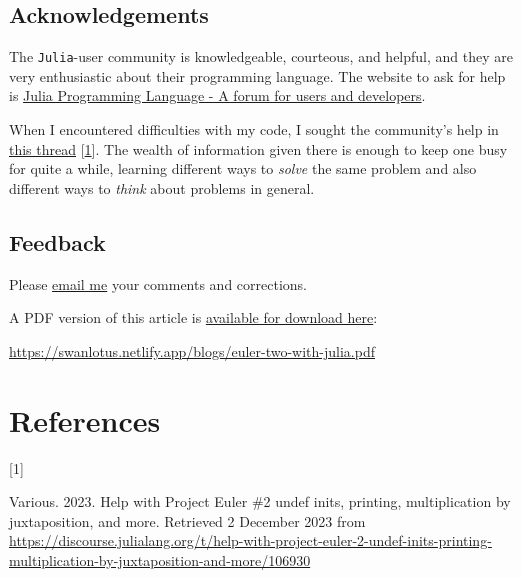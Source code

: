 \documentclass[
  a4paper,
]{article}
\newlength{\cslhangindent}
\newlength{\csllabelwidth}
\newlength{\cslentryspacingunit} %
\newenvironment{CSLReferences}[2] %
 {%
  \setlength{\parindent}{0pt}
  \ifodd #1
  \let\oldpar\par
  \def\par{\hangindent=\cslhangindent\oldpar}
  \fi
  \setlength{\parskip}{#2\cslentryspacingunit}
 }%
 {}
\newcommand{\CSLLeftMargin}[1]{\parbox[t]{\csllabelwidth}{#1}}
\newcommand{\CSLRightInline}[1]{\parbox[t]{\linewidth - \csllabelwidth}{#1}\break}
\begin{document}
\hypertarget{acknowledgements}{%
\subsection{Acknowledgements}\label{acknowledgements}}

The \texttt{Julia}-user community is knowledgeable, courteous, and
helpful, and they are very enthusiastic about their programming
language. The website to ask for help is
\href{https://discourse.julialang.org/}{Julia Programming Language - A
forum for users and developers}.

When I encountered difficulties with my code, I sought the community's
help in
\href{https://discourse.julialang.org/t/help-with-project-euler-2-undef-inits-printing-multiplication-by-juxtaposition-and-more/106930}{this
thread} {[}\protect\hyperlink{ref-julia-help}{1}{]}. The wealth of
information given there is enough to keep one busy for quite a while,
learning different ways to \emph{solve} the same problem and also
different ways to \emph{think} about problems in general.

\hypertarget{feedback}{%
\subsection{Feedback}\label{feedback}}

Please \href{mailto:feedback.swanlotus@gmail.com}{email me} your
comments and corrections.

\noindent A PDF version of this article is
\href{/euler-two-with-julia.pdf}{available for download here}:

\begin{small}

\begin{sffamily}

\url{https://swanlotus.netlify.app/blogs/euler-two-with-julia.pdf}

\end{sffamily}

\end{small}

\hypertarget{bibliography}{%
\section*{References}\label{bibliography}}

\hypertarget{refs}{}
\begin{CSLReferences}{0}{0}
\leavevmode{}%
\CSLLeftMargin{{[}1{]} }%
\CSLRightInline{Various. 2023. {Help with Project Euler \#2\: undef
inits, printing, multiplication by juxtaposition, and more}. Retrieved 2
December 2023 from
\url{https://discourse.julialang.org/t/help-with-project-euler-2-undef-inits-printing-multiplication-by-juxtaposition-and-more/106930}}

\end{CSLReferences}
\end{document}
